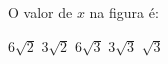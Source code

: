 O valor de $x$ na figura \'e:

\parbox{0.3\linewidth}{

$6\sqrt{2}$
$3\sqrt{2}$
$6\sqrt{3}$
$3\sqrt{3}$
$\sqrt{3}$

}\parbox{0.69\linewidth}{
\begin{center}
\vspace{-3mm}
\vspace{-9mm}
\end{center}
}


